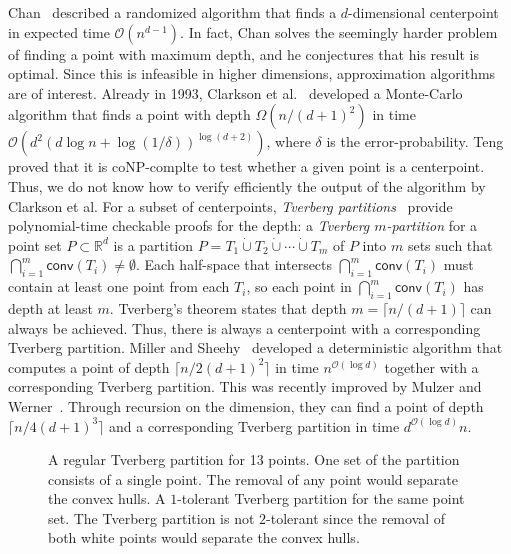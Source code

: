 \documentclass[oribibl,envcountsame,envcountsect]{llncs}
\newcommand{\bo}[1]{\mathcal{O}(#1)}
\newcommand{\conv}{\mathsf{conv}}
\newcommand{\real}{\mathbb{R}}
\begin{document}
Chan~\cite{Chan2004} described a randomized algorithm that
finds a $d$-dimensional centerpoint in expected time
$\bo{n^{d-1}}$. In fact, Chan solves the seemingly harder problem of finding a
point with maximum depth, and he conjectures that his result is optimal.
Since this is infeasible in higher
dimensions, approximation algorithms are of interest. Already in 1993, Clarkson et
al.~\cite{Clarkson1996} developed a Monte-Carlo algorithm that finds a point
with depth $\Omega(n/(d+1)^2)$ in time $\bo{d^2(d\log n +
  \log(1/\delta))^{\log(d+2)}}$, where $\delta$ is the error-probability.
Teng~\cite{Teng1992} proved that it is coNP-complte to test whether
a given point is a centerpoint. Thus, we do not know how to verify
efficiently the output of the algorithm by Clarkson et al. For a subset
of centerpoints, \emph{Tverberg partitions}~\cite{Tverberg1966} provide
polynomial-time checkable proofs for the depth: a \emph{Tverberg $m$-partition} for a
point set $P\subset \real^d$ is a partition
$P = T_1 \dot\cup T_2 \dot\cup \cdots \dot\cup T_m$ of $P$ into $m$ sets such
that $\bigcap_{i=1}^{m} \conv(T_i)\neq \emptyset$.  Each half-space that
intersects $\bigcap_{i=1}^{m} \conv(T_i)$ must contain at least one
point from each $T_i$, so each point in $\bigcap_{i=1}^{m} \conv(T_i)$ has
depth at least $m$.
Tverberg's theorem states that depth $m = \lceil n/(d+1) \rceil$ can always be
achieved.
Thus, there is always a centerpoint with a corresponding Tverberg partition.
Miller and Sheehy~\cite{Miller2010} developed
a deterministic algorithm that computes a
point of depth $\lceil n/2(d+1)^2\rceil$ in time $n^{\bo{\log d}}$ together
with a corresponding Tverberg partition. This was recently improved by Mulzer
and Werner~\cite{Mulzer2013}. Through recursion on the dimension, they can find
a point of depth $\lceil n/4(d+1)^3 \rceil$ and a corresponding Tverberg partition
in time $d^{\bo{\log d}} n$.

\begin{figure}[htbp]
  \newcommand{\imgwidth}{0.42\textwidth}
  \begin{center}
    \hspace{1cm}
  \end{center}
  \caption{
     A regular Tverberg partition
    for 13 points. One set of the partition consists of
    a single point. The removal of any point would separate the
    convex hulls.
     A $1$-tolerant Tverberg partition
    for the same point set. The Tverberg partition is not
    $2$-tolerant since the removal of both white points would
    separate the convex hulls.
  }
  \label{intro:fig:tolex}
\end{figure}
\end{document}
